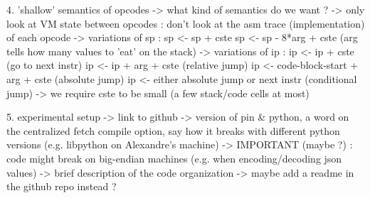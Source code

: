 \documentclass[french]{article}
\begin{document}
4. 'shallow' semantics of opcodes
	-> what kind of semantics do we want ? 
		-> only look at VM state between opcodes : don't look at the asm trace (implementation) of each opcode
		-> variations of sp :
			sp <- sp + cste 
			sp <- sp - 8*arg + cste (arg tells how many values to 'eat' on the stack)
		-> variations of ip :
			ip <- ip + cste (go to next instr)
			ip <- ip + arg + cste (relative jump)
			ip <- code-block-start + arg + cste (absolute jump)
			ip <- either absolute jump or next instr (conditional jump)
		-> we require cste to be small (a few stack/code cells at most)
		
5. experimental setup 
	-> link to github
	-> version of pin & python, a word on the centralized fetch compile option, say how it breaks with different python versions (e.g. libpython on Alexandre's machine) 
	-> IMPORTANT (maybe ?) : code might break on big-endian machines (e.g. when encoding/decoding json values)
	-> brief description of the code organization -> maybe add a readme in the github repo instead ?
	
\fi 
\end{document}
